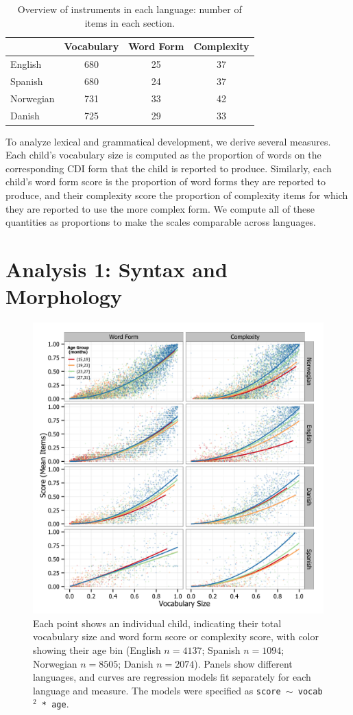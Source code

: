 \documentclass[10pt,letterpaper]{article}
\begin{document}
\begin{table}[t]
\begin{center}
\begin{tabular}{lccc}
\hline
& Vocabulary & Word Form & Complexity\\ 
\hline
English & 680 & 25 & 37\\ 
Spanish & 680 & 24 & 37\\ 
Norwegian & 731 & 33 & 42\\ 
Danish & 725 & 29 & 33\\ 
\hline
\end{tabular}
\caption{\label{table:measures} Overview of instruments in each language: number of items in each section.}
\end{center}
\end{table}

To analyze lexical and grammatical development, we derive several measures. Each child's vocabulary size is computed as the proportion of words on the corresponding CDI form that the child is reported to produce. Similarly, each child's word form score is the proportion of word forms they are reported to produce, and their complexity score the proportion of complexity items for which they are reported to use the more complex form. We compute all of these quantities as proportions to make the scales comparable across languages.

\section{Analysis 1: Syntax and Morphology}

\begin{figure}[t!]
\centering
\includegraphics[width=.75\textwidth]{plots/grammar.png}
\caption{\label{fig:grammar} Each point shows an individual child, indicating their total vocabulary size and word form score or complexity score, with color showing their age bin (English $n=4137$; Spanish $n=1094$; Norwegian $n=8505$; Danish $n=2074$). Panels show different languages, and curves are regression models fit separately for each language and measure. The models were specified as \small{\tt{score $\sim$ vocab$^{2}$ * age}}.} 
\end{figure}
\end{document}
